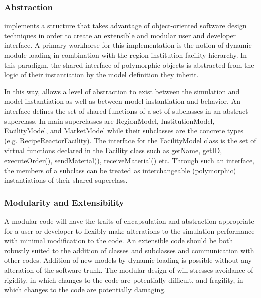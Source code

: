 \subsubsection{Abstraction}

\Cyclus implements a structure that takes advantage of 
object-oriented software design techniques in order to create an 
extensible and modular user and developer interface. A primary 
workhorse for this implementation is the notion of dynamic module 
loading in combination with the region institution facility  
hierarchy. In this paradigm, the shared interface of polymorphic 
objects is abstracted from the logic of their instantiation by the 
model definition they inherit. 

In this way, \Cyclus allows a level of abstraction to exist between 
the simulation and model instantiation 
as well as between model instantiation and behavior.
An interface defines the set of shared functions of a set of 
subclasses in an abstract superclass. In \Cyclus main superclasses are 
RegionModel, InstitutionModel, FacilityModel, and MarketModel while 
their subclasses are the concrete types (e.g. RecipeReactorFacility). 
The interface for the FacilityModel class is the set of 
virtual functions declared in the Facility class such as getName, 
getID, executeOrder(), sendMaterial(), receiveMaterial() etc.  Through 
such an interface, the members of a subclass can be treated as 
interchangeable (polymorphic) instantiations of their shared 
superclass. 

\subsubsection{Modularity and Extensibility}

A modular code will have the traits of encapsulation and abstraction 
appropriate for a user or developer to flexibly make alterations to 
the simulation performance with minimal modification to the code. An 
extensible code should be both robustly suited to the addition of 
classes and subclasses and communication with other codes. Addition of 
new models by dynamic loading is possible without any alteration of 
the software trunk. The modular design of \Cyclus will stresses avoidance of rigidity, in 
which changes to the code are potentially difficult, and fragility, in 
which changes to the code are potentially damaging.

